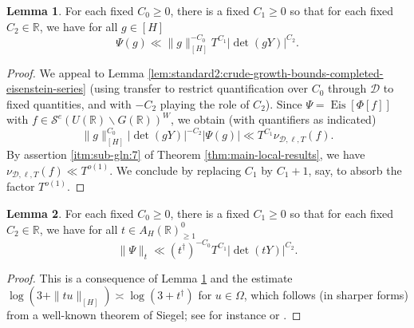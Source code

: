 \documentclass[reqno]{amsart}
\DeclareMathOperator{\Eis}{Eis}
\theoremstyle{plain} \newtheorem{theorem} {Theorem}
\theoremstyle{definition} \newtheorem{definition} [theorem] {Definition}
\theoremstyle{itplain} %
\newtheorem{lemma}[theorem]{Lemma}
\numberwithin{equation}{section}
\numberwithin{theorem}{section}
\renewcommand{\geq}{\geqslant}
\begin{document}
\begin{lemma}\label{lem:each-fixed-c_0-Psi-crude}
  For each fixed $C_0 \geq 0$, there is a fixed $C_1 \geq 0$ so that for each fixed $C_2 \in \mathbb{R}$, we have for all $g \in [H]$
  \begin{equation*}
    \Psi(g)
    \ll
    \|g\|_{[H]}^{-C_0}
    T^{C_1}
    \left\lvert \det(g Y) \right\rvert^{C_2}.
  \end{equation*}
\end{lemma}
\begin{proof}
  We appeal to Lemma \ref{lem:standard2:crude-growth-bounds-completed-eisenstein-series} (using transfer to restrict quantification over $C_0$ through $\mathcal{D}$ to fixed quantities, and with $-C_2$ playing the role of $C_2$).  Since $\Psi = \Eis[\Phi[f]]$ with $f \in \mathcal{S}^e(U(\mathbb{R}) \backslash G(\mathbb{R}))^W$, we obtain (with quantifiers as indicated)
  \begin{equation*}
    \|g\|_{[H]}^{C_0} \left\lvert \det(g Y) \right\rvert^{-C_2} \left\lvert \Psi(g) \right\rvert \ll T^{C_1} \nu_{\mathcal{D},\ell,T}(f).
  \end{equation*}
  By assertion \eqref{itm:sub-gln:7} of Theorem \ref{thm:main-local-results}, we have $\nu_{\mathcal{D},\ell,T}(f) \ll T^{o(1)}$.  We conclude by replacing $C_1$ by $C_1 + 1$, say, to absorb the factor $T^{o(1)}$.
\end{proof}

\begin{lemma}\label{lem:standard2:each-fixed-c_0}
  For each fixed $C_0 \geq 0$, there is a fixed $C_1 \geq 0$ so that for each fixed $C_2 \in \mathbb{R}$, we have for all $t \in A_H(\mathbb{R})^0_{\geq 1}$
  \begin{equation}\label{eq:psi-_t-ll}
    \|\Psi \|_t \ll (t ^\dagger )^{-C_0} T^{C_1} |\det(t Y)|^{C_2}.
  \end{equation}
\end{lemma}
\begin{proof}
  This is a consequence of Lemma \ref{lem:each-fixed-c_0-Psi-crude} and the estimate $\log(3 + \|t u\|_{[H]}) \asymp \log(3 + t ^\dagger)$ for $u \in \Omega$, which follows (in sharper forms) from a well-known theorem of Siegel; see for instance \cite[Lemma 2.1]{MR1001613} or \cite[A.1.1 (viii)]{2016arXiv160206538B}.
\end{proof}
\end{document}
